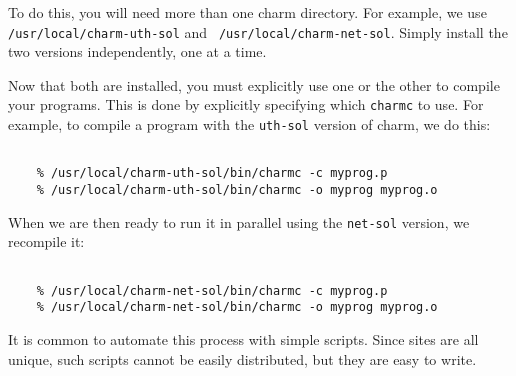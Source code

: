 To do this, you will need more than one charm directory.  For example,
we use {\tt /usr/local/charm-uth-sol} and {\tt
/usr/local/charm-net-sol}.  Simply install the two versions
independently, one at a time.

Now that both are installed, you must explicitly use one or the other
to compile your programs.  This is done by explicitly specifying which
{\tt charmc} to use.  For example, to compile a program with the {\tt uth-sol}
version of charm, we do this:

\begin{verbatim}

    % /usr/local/charm-uth-sol/bin/charmc -c myprog.p
    % /usr/local/charm-uth-sol/bin/charmc -o myprog myprog.o

\end{verbatim}

When we are then ready to run it in parallel using the {\tt net-sol}
version, we recompile it:

\begin{verbatim}

    % /usr/local/charm-net-sol/bin/charmc -c myprog.p
    % /usr/local/charm-net-sol/bin/charmc -o myprog myprog.o

\end{verbatim}

It is common to automate this process with simple scripts.  Since sites
are all unique, such scripts cannot be easily distributed, but they are
easy to write.



